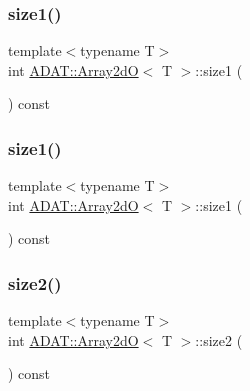 \mbox{\label{classADAT_1_1Array2dO_a8713bf273adbc5e2313e1afd8f88fe7c}} 
\subsubsection{\texorpdfstring{size1()}{size1()}\hspace{0.1cm}{\footnotesize\ttfamily [2/3]}}
{\footnotesize\ttfamily template$<$typename T$>$ \\
int \mbox{\hyperlink{classADAT_1_1Array2dO}{A\+D\+A\+T\+::\+Array2dO}}$<$ T $>$\+::size1 (\begin{DoxyParamCaption}{ }\end{DoxyParamCaption}) const\hspace{0.3cm}{\ttfamily [inline]}}

\mbox{\label{classADAT_1_1Array2dO_a8713bf273adbc5e2313e1afd8f88fe7c}} 
\subsubsection{\texorpdfstring{size1()}{size1()}\hspace{0.1cm}{\footnotesize\ttfamily [3/3]}}
{\footnotesize\ttfamily template$<$typename T$>$ \\
int \mbox{\hyperlink{classADAT_1_1Array2dO}{A\+D\+A\+T\+::\+Array2dO}}$<$ T $>$\+::size1 (\begin{DoxyParamCaption}{ }\end{DoxyParamCaption}) const\hspace{0.3cm}{\ttfamily [inline]}}

\mbox{\label{classADAT_1_1Array2dO_a0e743678b1d8c06547715d8929c9b2bf}} 
\subsubsection{\texorpdfstring{size2()}{size2()}\hspace{0.1cm}{\footnotesize\ttfamily [1/3]}}
{\footnotesize\ttfamily template$<$typename T$>$ \\
int \mbox{\hyperlink{classADAT_1_1Array2dO}{A\+D\+A\+T\+::\+Array2dO}}$<$ T $>$\+::size2 (\begin{DoxyParamCaption}{ }\end{DoxyParamCaption}) const\hspace{0.3cm}{\ttfamily [inline]}}

